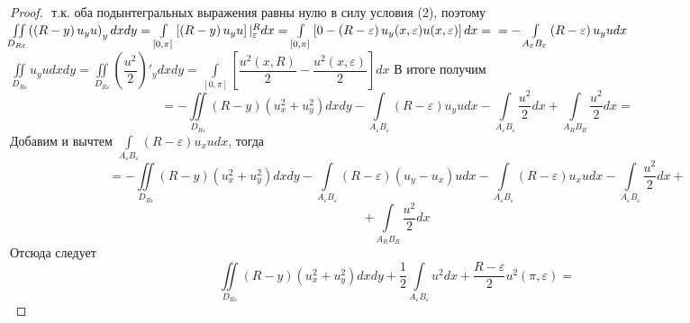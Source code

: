 \documentclass[a4paper, 11pt]{article}
\begin{document}
\begin{proof}
\begin{math}
		\end{math}
		т.к. оба подынтегральных выражения равны нулю в силу условия (2), поэтому \newline
		\begin{math}
			\iint\limits_{D_{R\varepsilon}} \left( \left(R - y\right) u_y u\right)_y dx dy = \int\limits_{[0,\pi]} \left[\left(R - y\right) u_y u\right] \vert_\varepsilon^R dx =
			\int\limits_{[0,\pi]} \left[0 - \left(R - \varepsilon \right) u_y(x, \varepsilon) u(x, \varepsilon) \right] dx = \\ = - \int\limits_{A_\varepsilon B_\varepsilon} \left(R - \varepsilon \right) u_yu dx
		\end{math} \newline
		\begin{math}
			\iint\limits_{D_{R\varepsilon}} u_y u dx dy = \iint\limits_{D_{R\varepsilon}} \left(\dfrac{u^2}{2}\right)'_ydx dy = \int\limits_{[0,\pi]} \left[\dfrac{u^2(x,R)}{2} - \dfrac{u^2(x, \varepsilon)}{2}\right] dx 
		\end{math}
		\newline
		В итоге получим
		\begin{equation*}
			= - \iint\limits_{D_{R\varepsilon}} \left(R - y\right) \left(u_x^2 + u_y^2\right) dx dy
			- \int\limits_{A_\varepsilon B_\varepsilon} \left(R - \varepsilon\right) u_y u dx 
			-\int\limits_{A_\varepsilon B_\varepsilon} \dfrac{u^2}{2} dx + \int\limits_{A_R B_R} \dfrac{u^2}{2} dx = 
		\end{equation*}
		Добавим и вычтем $\int\limits_{A_\varepsilon B_\varepsilon} \left(R - \varepsilon\right) u_x u dx$, тогда
		\begin{equation*}
			= - \iint\limits_{D_{R\varepsilon}} \left(R - y\right) \left(u_x^2 + u_y^2\right) dx dy - 
			\int\limits_{A_\varepsilon B_\varepsilon} \left(R - \varepsilon \right) \left(u_y - u_x\right)u dx - \int\limits_{A_\varepsilon B_\varepsilon} \left(R - \varepsilon\right) u_x u dx - \int\limits_{A_\varepsilon B_\varepsilon}\dfrac{u^2}{2} dx +
		\end{equation*}
		\begin{equation*}
			+ \int\limits_{A_R B_R} \dfrac{u^2}{2}dx
		\end{equation*}
		Отсюда следует
		\begin{equation*}
			\iint\limits_{D_{R\varepsilon}} \left(R - y\right) \left(u_x^2 + u_y^2\right) dx dy + \dfrac{1}{2}\int\limits_{A_\varepsilon B_\varepsilon} u^2 dx +\dfrac{R - \varepsilon}{2}u^2(\pi, \varepsilon)  =
		\end{equation*}

\end{proof}
\end{document}
